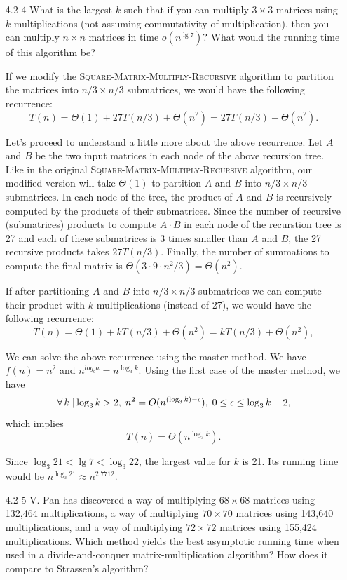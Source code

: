 \begin{enumerate}
\item[4.2{-}4]{What is the largest $k$ such that if you can multiply
$3 \times 3$ matrices using $k$ multiplications (not assuming commutativity of
multiplication), then you can multiply $n \times n$ matrices in time
$o(n^{\lg 7})$?  What would the running time of this algorithm be?
}

\begin{framed}
If we modify the \textsc{Square-Matrix-Multiply-Recursive} algorithm to
partition the matrices into $n/3 \times n/3$ submatrices, we would have the
following recurrence:
\[
T(n) = \Theta(1) + 27 T(n/3) + \Theta(n^2) = 27 T(n/3) + \Theta(n^2).
\]

Let's proceed to understand a little more about the above recurrence. Let $A$
and $B$ be the two input matrices in each node of the above recursion tree.
Like in the original \textsc{Square-Matrix-Multiply-Recursive} algorithm, our
modified version will take $\Theta(1)$ to partition $A$ and $B$ into $n/3 \times
n/3$ submatrices. In each node of the tree, the product of $A$ and $B$ is
recursively computed by the products of their submatrices. Since the number of
recursive (submatrices) products to compute $A \cdot B$ in each node of the
recurstion tree is 27 and each of these submatrices is $3$ times smaller than
$A$ and $B$, the 27 recursive products takes $27 T(n/3)$. Finally, the number of
summations to compute the final matrix is
$\Theta(3 \cdot 9 \cdot n^2/3) = \Theta(n^2)$.

If after partitioning $A$ and $B$ into $n/3 \times n/3$ submatrices we can
compute their product with $k$ multiplications (instead of 27), we would have
the following recurrence:
\[
T(n) = \Theta(1) + k T(n/3) + \Theta(n^2) = k T(n/3) + \Theta(n^2),
\]

We can solve the above recurrence using the master method. We have
$f(n) = n^2$ and $n^{log_b a} = n^{\log_3 k}$. Using the first case of the master
method, we have
\[
\operatorname{\forall} k \; | \log_3 k > 2, \; n^2 = O(n^{(\log_3 k) - \epsilon}), \; 0 \le \epsilon \le \log_3 k - 2,
\]
which implies
\[
T(n) = \Theta(n^{\log_3 k}).
\]

Since $\log_3 21 < \lg 7 < \log_3 22$, the largest value for $k$ is 21. Its
running time would be $n^{\log_3 21} \approx n^{2.7712}$.

\end{framed}

\item[4.2{-}5]{V. Pan has discovered a way of multiplying $68 \times 68$
matrices using 132,464 multiplications, a way of multiplying $70 \times 70$
matrices using 143,640 multiplications, and a way of multiplying $72 \times 72$
matrices using 155,424 multiplications. Which method yields the best asymptotic
running time when used in a divide-and-conquer matrix-multiplication algorithm?
How does it compare to Strassen's algorithm?}


\end{enumerate}
